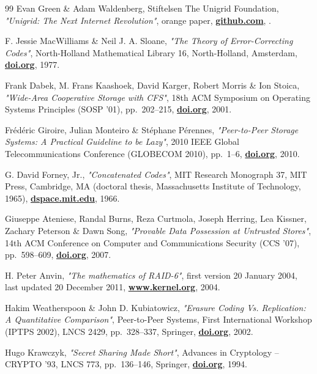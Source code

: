 \documentclass[10pt,a4paper,final]{article}
\let\oldhref\href
\renewcommand{\href}[2]{\oldhref{#1}{\bfseries#2}}
\begin{document}
\begin{thebibliography}{99}
	Evan Green \& Adam Waldenberg, Stiftelsen The Unigrid Foundation,
	\emph{"Unigrid: The Next Internet Revolution"},
	orange paper,
	\href{https://github.com/unigrid-project/documentation-orange-paper}{github.com},
	\the\year{}.

	F. Jessie MacWilliams \& Neil J. A. Sloane,
	\emph{"The Theory of Error-Correcting Codes"},
	North-Holland Mathematical Library 16, North-Holland, Amsterdam,
	\href{https://doi.org/10.1016/S0924-6509(08)X7030-8}{doi.org},
	1977.

	Frank Dabek, M. Frans Kaashoek, David Karger, Robert Morris \& Ion Stoica,
	\emph{"Wide-Area Cooperative Storage with CFS"},
	18th ACM Symposium on Operating Systems Principles (SOSP '01), pp.~202--215,
	\href{https://doi.org/10.1145/502034.502054}{doi.org},
	2001.

	Fr\'{e}d\'{e}ric Giroire, Julian Monteiro \& St\'{e}phane P\'{e}rennes,
	\emph{"Peer-to-Peer Storage Systems: A Practical Guideline to be Lazy"},
	2010 IEEE Global Telecommunications Conference (GLOBECOM 2010), pp.~1--6,
	\href{https://doi.org/10.1109/GLOCOM.2010.5683761}{doi.org},
	2010.

	G. David Forney, Jr.,
	\emph{"Concatenated Codes"},
	MIT Research Monograph 37, MIT Press, Cambridge, MA (doctoral thesis, Massachusetts Institute of Technology, 1965),
	\href{https://dspace.mit.edu/handle/1721.1/13449}{dspace.mit.edu},
	1966.

	Giuseppe Ateniese, Randal Burns, Reza Curtmola, Joseph Herring, Lea Kissner, Zachary Peterson \& Dawn Song,
	\emph{"Provable Data Possession at Untrusted Stores"},
	14th ACM Conference on Computer and Communications Security (CCS '07), pp.~598--609,
	\href{https://doi.org/10.1145/1315245.1315318}{doi.org},
	2007.

	H. Peter Anvin,
	\emph{"The mathematics of RAID-6"},
	first version 20 January 2004, last updated 20 December 2011,
	\href{https://www.kernel.org/pub/linux/kernel/people/hpa/raid6.pdf}{www.kernel.org},
	2004.

	Hakim Weatherspoon \& John D. Kubiatowicz,
	\emph{"Erasure Coding Vs. Replication: A Quantitative Comparison"},
	Peer-to-Peer Systems, First International Workshop (IPTPS 2002), LNCS 2429, pp.~328--337, Springer,
	\href{https://doi.org/10.1007/3-540-45748-8_31}{doi.org},
	2002.

	Hugo Krawczyk,
	\emph{"Secret Sharing Made Short"},
	Advances in Cryptology -- CRYPTO '93, LNCS 773, pp.~136--146, Springer,
	\href{https://doi.org/10.1007/3-540-48329-2_12}{doi.org},
	1994.


\end{thebibliography}
\end{document}
